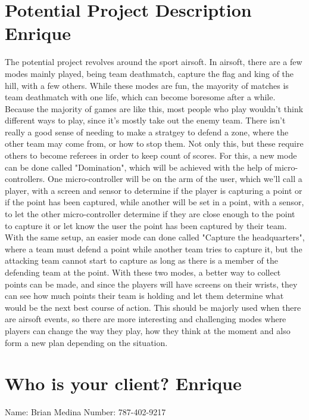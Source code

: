 \section{Potential Project Description Enrique}
The potential project revolves around the sport airsoft. In airsoft, there are a few modes mainly played, being team deathmatch, capture the flag and king of the hill, with a few others. While these modes are fun, the mayority of matches is team deathmatch with one life, which can become boresome after a while. Because the majority of games are like this, most people who play wouldn't think different ways to play, since it's mostly take out the enemy team. There isn't really a good sense of needing to make a stratgey to defend a zone, where the other team may come from, or how to stop them. Not only this, but these require others to become referees in order to keep count of scores. For this, a new mode can be done called "Domination", which will be achieved with the help of micro-controllers. One micro-controller will be on the arm of the user, which we'll call a player, with a screen and sensor to determine if the player is capturing a point or if the point has been captured, while another will be set in a point, with a sensor, to let the other micro-controller determine if they are close enough to the point to capture it or let know the user the point has been captured by their team. With the same setup, an easier mode can done called "Capture the headquarters", where a team must defend a point while another team tries to capture it, but the attacking team cannot start to capture as long as there is a member of the defending team at the point. With these two modes, a better way to collect points can be made, and since the players will have screens on their wrists, they can see how much points their team is holding and let them determine what would be the next best course of action. This should be majorly used when there are airsoft events, so there are more interesting and challenging modes where players can change the way they play, how they think at the moment and also form a new plan depending on the situation.
\newpage
\section{Who is your client? Enrique}
Name: Brian Medina
Number: 787-402-9217
